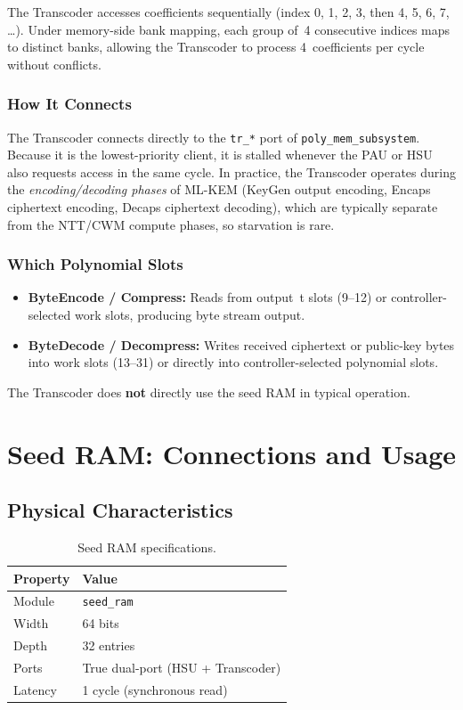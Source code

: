 \documentclass[11pt,letterpaper]{article}
\begin{document}
The Transcoder accesses coefficients sequentially (index 0, 1, 2, 3,
then 4, 5, 6, 7, \ldots). Under memory-side bank mapping, each group of~4
consecutive indices maps to distinct banks, allowing the Transcoder to
process 4~coefficients per cycle without conflicts.

\subsubsection{How It Connects}

The Transcoder connects directly to the \texttt{tr\_*} port of
\texttt{poly\_mem\_subsystem}. Because it is the lowest-priority
client, it is stalled whenever the PAU or HSU also requests access in
the same cycle. In practice, the Transcoder operates during the
\emph{encoding/decoding phases} of ML-KEM (KeyGen output encoding,
Encaps ciphertext encoding, Decaps ciphertext decoding), which are
typically separate from the NTT/CWM compute phases, so starvation is
rare.

\subsubsection{Which Polynomial Slots}

\begin{itemize}
  \item \textbf{ByteEncode / Compress:} Reads from output~t slots
    (9--12) or controller-selected work slots, producing byte stream output.
  \item \textbf{ByteDecode / Decompress:} Writes received ciphertext
    or public-key bytes into work slots (13--31) or directly into
    controller-selected polynomial slots.
\end{itemize}

The Transcoder does \textbf{not} directly use the seed RAM in typical
operation.

\section{Seed RAM: Connections and Usage}
\label{sec:seed}

\subsection{Physical Characteristics}

\begin{table}[H]
\centering
\caption{Seed RAM specifications.}
\begin{tabular}{@{}ll@{}}
\toprule
\textbf{Property} & \textbf{Value} \\
\midrule
Module   & \texttt{seed\_ram} \\
Width    & 64 bits \\
Depth    & 32 entries \\
Ports    & True dual-port (HSU + Transcoder) \\
Latency  & 1 cycle (synchronous read) \\
\bottomrule
\end{tabular}
\end{table}
\end{document}
